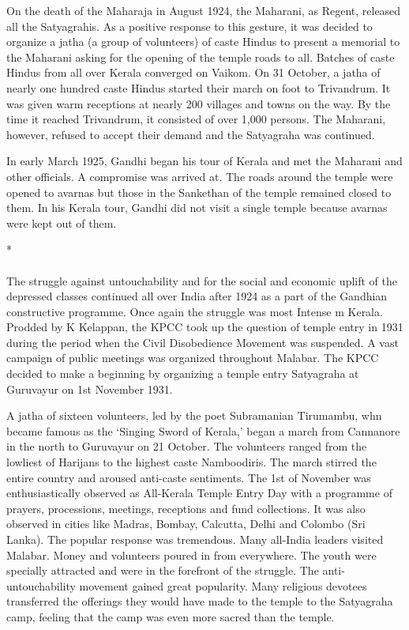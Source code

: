 \begin{multicols}{2}
On the death of the Maharaja in August 1924, the Maharani, as Regent, released all the Satyagrahis. As a positive response to this gesture, it was decided to organize a jatha (a group of volunteers) of caste Hindus to present a memorial to the Maharani asking for the opening of the temple roads to all. Batches of caste Hindus from all over Kerala converged on Vaikom. On 31 October, a jatha of nearly one hundred caste Hindus started their march on foot to Trivandrum. It was given warm receptions at nearly 200 villages and towns on the way. By the time it reached Trivandrum, it consisted of over 1,000 persons. The Maharani, however, refused to accept their demand and the Satyagraha was continued.

In early March 1925, Gandhi began his tour of Kerala and met the Maharani and other officials. A compromise was arrived at. The roads around the temple were opened to avarnas but those in the Sankethan of the temple remained closed to them. In his Kerala tour, Gandhi did not visit a single temple because avarnas were kept out of them.

\begin{center}*\end{center}

\paragraph*{}

The struggle against untouchability and for the social and economic uplift of the depressed classes continued all over India after 1924 as a part of the Gandhian constructive programme. Once again the struggle was most Intense m Kerala. Prodded by K Kelappan, the KPCC took up the question of temple entry in 1931 during the period when the Civil Disobedience Movement was suspended. A vast campaign of public meetings was organized throughout Malabar. The KPCC decided to make a beginning by organizing a temple entry Satyagraha at Guruvayur on 1st November 1931.

A jatha of sixteen volunteers, led by the poet Subramanian Tirumambu, whn became famous as the `Singing Sword of Kerala,' began a march from Cannanore in the north to Guruvayur on 21 October. The volunteers ranged from the lowliest of Harijans to the highest caste Namboodiris. The march stirred the entire country and aroused anti-caste sentiments. The 1st of November was enthusiastically observed as All-Kerala Temple Entry Day with a programme of prayers, processions, meetings, receptions and fund collections. It was also observed in cities like Madras, Bombay, Calcutta, Delhi and Colombo (Sri Lanka). The popular response was tremendous. Many all-India leaders visited Malabar. Money and volunteers poured in from everywhere. The youth were specially attracted and were in the forefront of the struggle. The anti-untouchability movement gained great popularity. Many religious devotees transferred the offerings they would have made to the temple to the Satyagraha camp, feeling that the camp was even more sacred than the temple.


\end{multicols}
